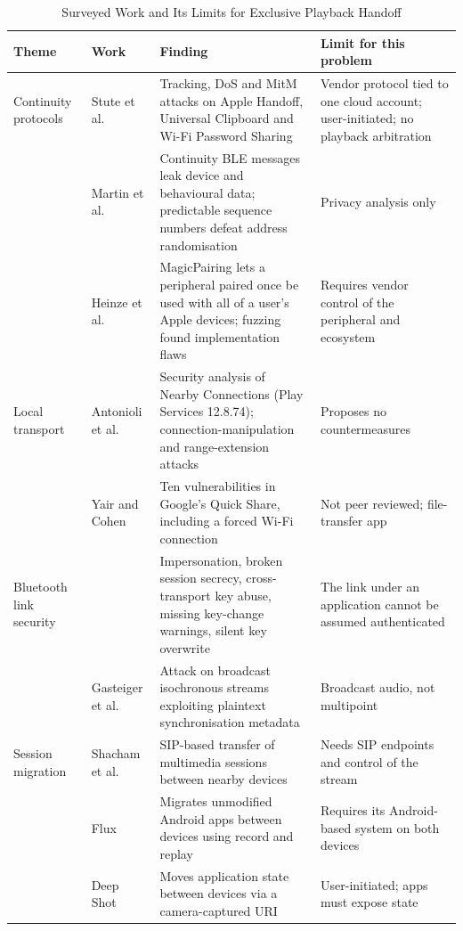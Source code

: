 \documentclass[conference]{IEEEtran}
\begin{document}
\begin{table}[t]
\caption{Surveyed Work and Its Limits for Exclusive Playback Handoff}
\label{tab:survey}
\centering
\footnotesize
\begin{tabularx}{\textwidth}{@{}L{2.2cm}L{3.4cm}YY@{}}
\toprule
\textbf{Theme} & \textbf{Work} & \textbf{Finding} & \textbf{Limit for this problem} \\
\midrule
Continuity protocols & Stute et al.~\cite{stute2021} & Tracking, DoS and MitM attacks on Apple Handoff, Universal Clipboard and Wi-Fi Password Sharing & Vendor protocol tied to one cloud account; user-initiated; no playback arbitration \\
 & Martin et al.~\cite{martin2019} & Continuity BLE messages leak device and behavioural data; predictable sequence numbers defeat address randomisation & Privacy analysis only \\
 & Heinze et al.~\cite{heinze2020} & MagicPairing lets a peripheral paired once be used with all of a user's Apple devices; fuzzing found implementation flaws & Requires vendor control of the peripheral and ecosystem \\
\midrule
Local transport & Antonioli et al.~\cite{antonioli2019} & Security analysis of Nearby Connections (Play Services 12.8.74); connection-manipulation and range-extension attacks & Proposes no countermeasures \\
 & Yair and Cohen~\cite{quickshell2024} & Ten vulnerabilities in Google's Quick Share, including a forced Wi-Fi connection & Not peer reviewed; file-transfer app \\
\midrule
Bluetooth link security & \cite{bias2020,bluffs2023,blurtooth2020,happymitm2021,stealtooth2025} & Impersonation, broken session secrecy, cross-transport key abuse, missing key-change warnings, silent key overwrite & The link under an application cannot be assumed authenticated \\
 & Gasteiger et al.~\cite{bison2023} & Attack on broadcast isochronous streams exploiting plaintext synchronisation metadata & Broadcast audio, not multipoint \\
\midrule
Session migration & Shacham et al.~\cite{shacham2007,rfc5631} & SIP-based transfer of multimedia sessions between nearby devices & Needs SIP endpoints and control of the stream \\
 & Flux~\cite{flux2015} & Migrates unmodified Android apps between devices using record and replay & Requires its Android-based system on both devices \\
 & Deep Shot~\cite{deepshot2011} & Moves application state between devices via a camera-captured URI & User-initiated; apps must expose state \\

\end{tabularx}
\end{table}
\end{document}
